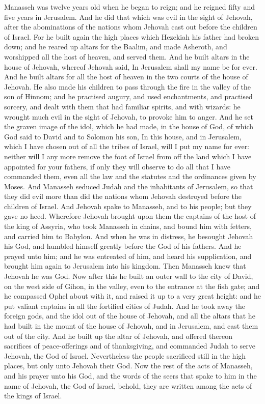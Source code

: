 Manasseh was twelve years old when he began to reign; and he reigned fifty and five years in Jerusalem. And he did that which was evil in the sight of Jehovah, after the abominations of the nations whom Jehovah cast out before the children of Israel. For he built again the high places which Hezekiah his father had broken down; and he reared up altars for the Baalim, and made Asheroth, and worshipped all the host of heaven, and served them. And he built altars in the house of Jehovah, whereof Jehovah said, In Jerusalem shall my name be for ever. And he built altars for all the host of heaven in the two courts of the house of Jehovah. He also made his children to pass through the fire in the valley of the son of Hinnom; and he practised augury, and used enchantments, and practised sorcery, and dealt with them that had familiar spirits, and with wizards: he wrought much evil in the sight of Jehovah, to provoke him to anger. And he set the graven image of the idol, which he had made, in the house of God, of which God said to David and to Solomon his son, In this house, and in Jerusalem, which I have chosen out of all the tribes of Israel, will I put my name for ever: neither will I any more remove the foot of Israel from off the land which I have appointed for your fathers, if only they will observe to do all that I have commanded them, even all the law and the statutes and the ordinances given by Moses. And Manasseh seduced Judah and the inhabitants of Jerusalem, so that they did evil more than did the nations whom Jehovah destroyed before the children of Israel.  And Jehovah spake to Manasseh, and to his people; but they gave no heed. Wherefore Jehovah brought upon them the captains of the host of the king of Assyria, who took Manasseh in chains, and bound him with fetters, and carried him to Babylon. And when he was in distress, he besought Jehovah his God, and humbled himself greatly before the God of his fathers. And he prayed unto him; and he was entreated of him, and heard his supplication, and brought him again to Jerusalem into his kingdom. Then Manasseh knew that Jehovah he was God.  Now after this he built an outer wall to the city of David, on the west side of Gihon, in the valley, even to the entrance at the fish gate; and he compassed Ophel about with it, and raised it up to a very great height: and he put valiant captains in all the fortified cities of Judah. And he took away the foreign gods, and the idol out of the house of Jehovah, and all the altars that he had built in the mount of the house of Jehovah, and in Jerusalem, and cast them out of the city. And he built up the altar of Jehovah, and offered thereon sacrifices of peace-offerings and of thanksgiving, and commanded Judah to serve Jehovah, the God of Israel. Nevertheless the people sacrificed still in the high places, but only unto Jehovah their God.  Now the rest of the acts of Manasseh, and his prayer unto his God, and the words of the seers that spake to him in the name of Jehovah, the God of Israel, behold, they are written among the acts of the kings of Israel. 